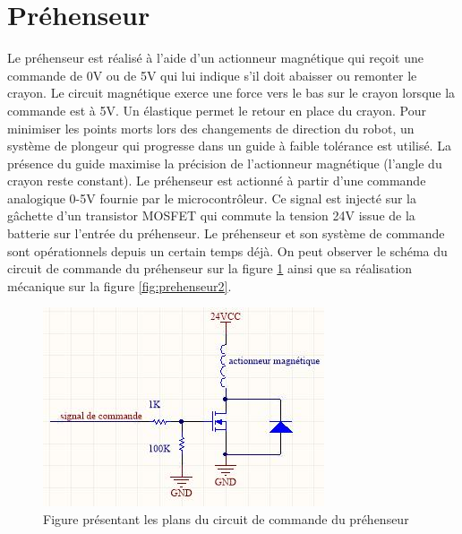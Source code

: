 \section{Préhenseur}
Le préhenseur est réalisé à l’aide d’un actionneur magnétique qui reçoit une commande de 0V ou de 5V qui lui indique s’il doit abaisser ou remonter le crayon. Le circuit magnétique exerce une force vers le bas sur le crayon lorsque la commande est à 5V. Un élastique permet le retour en place du crayon. Pour minimiser les points morts lors des changements de direction du robot, un système de plongeur qui progresse dans un guide à faible tolérance est utilisé. La présence du guide maximise la précision de l’actionneur magnétique (l'angle du crayon reste constant). Le préhenseur est actionné à partir d'une commande analogique 0-5V fournie par le microcontrôleur. Ce signal est injecté sur la gâchette d’un transistor MOSFET qui commute la tension 24V issue de la batterie sur l'entrée du préhenseur. Le préhenseur et son système de commande sont opérationnels depuis un certain temps déjà. On peut observer le schéma du circuit de commande du préhenseur sur la figure \ref{fig:prehenseur} ainsi que sa réalisation mécanique sur la figure \ref{fig:prehenseur2}.

\begin{figure}[htbp]
\centering
\includegraphics[scale=0.5]{fig/prehenseur.jpg}
\caption{Figure présentant les plans du circuit de commande du préhenseur}
\label{fig:prehenseur}
\end{figure}

